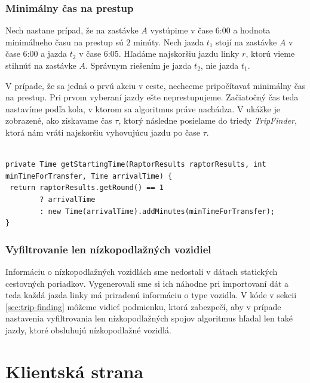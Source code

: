 \subsubsection{Minimálny čas na prestup}
Nech nastane prípad, že na zastávke $A$ vystúpime v čase 6:00 a hodnota minimálneho času na prestup sú $2$ minúty. Nech jazda $t_1$ stojí na zastávke $A$ v čase 6:00 a jazda $t_2$ v čase 6:05. Hľadáme najskoršiu jazdu linky $r$, ktorú vieme stihnúť na zastávke $A$. Správnym riešením je jazda $t_2$, nie jazda $t_1$.

V prípade, že sa jedná o prvú akciu v ceste, nechceme pripočítavať minimálny čas na prestup. Pri prvom vyberaní jazdy ešte neprestupujeme. Začiatočný čas teda nastavíme podľa kola, v ktorom sa algoritmus práve nachádza. V ukážke je zobrazené, ako získavame čas $\tau$, ktorý následne posielame do triedy \textit{TripFinder}, ktorá nám vráti najskoršiu vyhovujúcu jazdu po čase $\tau$.\\ \\
\begin{lstlisting}
private Time getStartingTime(RaptorResults raptorResults, int minTimeForTransfer, Time arrivalTime) {
 return raptorResults.getRound() == 1
        ? arrivalTime
        : new Time(arrivalTime).addMinutes(minTimeForTransfer);
}
\end{lstlisting} 

\subsubsection{Vyfiltrovanie len nízkopodlažných vozidiel}
Informáciu o nízkopodlažných vozidlách sme nedostali v dátach statických cestovných poriadkov. Vygenerovali sme si ich náhodne pri importovaní dát a teda každá jazda linky má priradenú informáciu o type vozidla.
V kóde v sekcii \ref{sec:trip-finding} môžeme vidieť podmienku, ktorá zabezpečí, aby v prípade nastavenia vyfiltrovania len nízkopodlažných spojov algoritmus hľadal len také jazdy, ktoré obsluhujú nízkopodlažné vozidlá.

\section{Klientská strana} 



